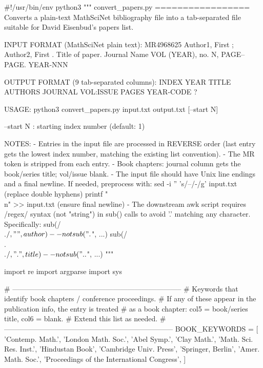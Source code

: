 #!/usr/bin/env python3
"""
convert_papers.py
=================
Converts a plain-text MathSciNet bibliography file into a tab-separated
file suitable for David Eisenbud's papers list.

INPUT FORMAT (MathSciNet plain text):
    MR4968625  Author1, First ; Author2, First . Title of paper.
     Journal Name  VOL  (YEAR),  no. N, PAGE--PAGE. YEAR-NNN

OUTPUT FORMAT (9 tab-separated columns):
    INDEX  YEAR  TITLE  AUTHORS  JOURNAL  VOL:ISSUE  PAGES  YEAR-CODE  ?

USAGE:
    python3 convert_papers.py input.txt output.txt [--start N]

    --start N   : starting index number (default: 1)

NOTES:
- Entries in the input file are processed in REVERSE order (last entry
  gets the lowest index number, matching the existing list convention).
- The MR token is stripped from each entry.
- Book chapters: journal column gets the book/series title; vol/issue blank.
- The input file should have Unix line endings and a final newline.
  If needed, preprocess with:
      sed -i '' 's/--/-/g' input.txt   (replace double hyphens)
      printf "\\n" >> input.txt         (ensure final newline)
- The downstream awk script requires /regex/ syntax (not "string") in
  sub() calls to avoid '.' matching any character. Specifically:
      sub(/\\.$/, "", author)       -- not sub("\\.$", ...)
      sub(/\\.\\.$/,  ".", title)   -- not sub("\\.\\.$", ...)
"""

import re
import argparse
import sys

# -----------------------------------------------------------------------
# Keywords that identify book chapters / conference proceedings.
# If any of these appear in the publication info, the entry is treated
# as a book chapter: col5 = book/series title, col6 = blank.
# Extend this list as needed.
# -----------------------------------------------------------------------
BOOK_KEYWORDS = [
    'Contemp. Math.',
    'London Math. Soc.',
    'Abel Symp.',
    'Clay Math.',
    'Math. Sci. Res. Inst.',
    'Hindustan Book',
    'Cambridge Univ. Press',
    'Springer, Berlin',
    'Amer. Math. Soc.',
    'Proceedings of the International Congress',
]

